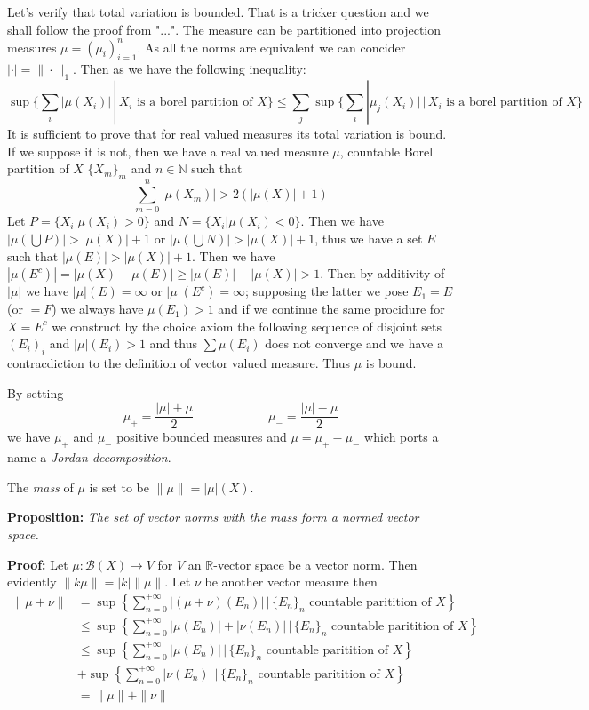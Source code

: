 \vspace{1ex}
Let's verify that total variation is bounded.
That is a tricker question and we
shall follow the proof from "...". The measure can be partitioned into projection measures
$\mu=(\mu_i)_{i=1}^n$. As all the norms are equivalent we can concider $|\cdot|
= \|\cdot\|_1$. Then as we have the following inequality:
\[\sup\{\sum_i|\mu(X_i)|\,|\,X_i\text{ is a borel partition of }X\} \leq \sum_j\sup\{\sum_i|\mu_j(X_i)|\,|\,X_i\text{ is a borel partition of }X\}\]
It is sufficient to prove that for real valued measures its total variation is bound.
If we suppose it is not, then we have a real valued measure $\mu$,
countable Borel partition of $X$ $\{X_m\}_m$ and $n\in\mathbb{N}$ such that
\[\sum_{m=0}^n|\mu(X_m)|>2(|\mu(X)|+1)\]
Let $P=\{X_i|\mu(X_i)>0\}$ and $N=\{X_i|\mu(X_i)<0\}$. Then
we have $|\mu(\bigcup P)|>|\mu(X)|+1$ or $|\mu(\bigcup N)|>|\mu(X)|+1$, thus we
have a set $E$ such that $|\mu(E)|>|\mu(X)|+1$. Then we have $|\mu(E^c)|=|\mu(X)
-\mu(E)|\geq |\mu(E)|-|\mu(X)|>1$. Then by additivity of $|\mu|$ we have
$|\mu|(E)=\infty$ or $|\mu|(E^c)=\infty$; supposing the latter we pose $E_1=E$
(or $=F$) we always have $\mu(E_1)>1$ and if we continue the same procidure for
$X=E^c$ we construct by the choice axiom the following sequence of disjoint sets
$(E_i)_i$ and $|\mu|(E_i)>1$ and thus $\sum\mu(E_i)$ does not converge and we
have a contracdiction to the definition of vector valued measure. Thus $\mu$
is bound.

\vspace{1ex}
By setting
\[\mu_+=\frac{|\mu|+\mu}{2}\quad\quad\quad\quad\quad\quad\mu_-=\frac{|\mu|-\mu}{2}\]
we have $\mu_+$ and $\mu_-$ positive bounded measures and $\mu=\mu_+-\mu_-$
which ports a name a \emph{Jordan decomposition}.


\vspace{1ex}
The \emph{mass} of $\mu$ is set to be $\|\mu\|=|\mu|(X)$.

\vspace{1ex}
\textbf{Proposition:}
\textit{The set of vector norms with the mass form a normed vector space.}

\vspace{1ex}
\textbf{Proof:} Let $\mu:\mathcal{B}(X)\rightarrow V$ for $V$ an $\mathbb
R$-vector space be a vector norm. Then evidently $\|k\mu\|=|k|\|\mu\|$. Let $\nu$
be another vector measure then
\begin{align*}
    \|\mu+\nu\|&=\sup\left\{\sum_{n=0}^{+\infty}|(\mu+\nu)(E_n)|\,|\,\{E_n\}_n\text{ countable paritition of }X\right\}\\
    &\leq\sup\left\{\sum_{n=0}^{+\infty}|\mu(E_n)|+|\nu(E_n)|\,|\,\{E_n\}_n\text{ countable paritition of }X\right\}\\
    &\leq\sup\left\{\sum_{n=0}^{+\infty}|\mu(E_n)|\,|\,\{E_n\}_n\text{ countable paritition of }X\right\}\\
    &+\sup\left\{\sum_{n=0}^{+\infty}|\nu(E_n)|\,|\,\{E_n\}_n\text{ countable paritition of }X\right\}\\
    &=\|\mu\|+\|\nu\|
\end{align*}

